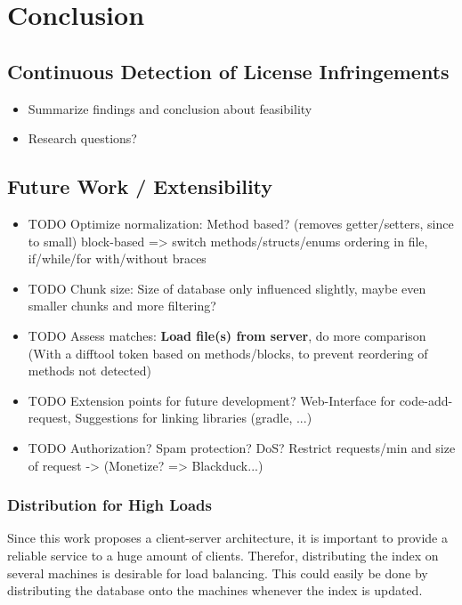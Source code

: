 
\chapter{Conclusion}\label{chapter:conclusion}

\section{Continuous Detection of License Infringements}
\begin{itemize}
	\item Summarize findings and conclusion about feasibility
	\item Research questions?
\end{itemize}

\section{Future Work / Extensibility}\label{section:approach/extensibility}
\begin{itemize}
	\item TODO Optimize normalization: Method based? (removes getter/setters, since to small) block-based => switch methods/structs/enums ordering in file, if/while/for with/without braces
	\item TODO Chunk size: Size of database only influenced slightly, maybe even smaller chunks and more filtering?
	\item TODO Assess matches: \textbf{Load file(s) from server}, do more comparison (With a difftool token based on methods/blocks, to prevent reordering of methods not detected)
	\item TODO Extension points for future development? Web-Interface for code-add-request, Suggestions for linking libraries (gradle, ...)
	\item TODO Authorization? Spam protection? DoS? Restrict requests/min and size of request -> (Monetize? => Blackduck...)
\end{itemize}

\subsection{Distribution for High Loads}
Since this work proposes a client-server architecture, it is important to provide a reliable service to a huge amount of clients.
Therefor, distributing the index on several machines is desirable for load balancing.
This could easily be done by distributing the database onto the machines whenever the index is updated.


